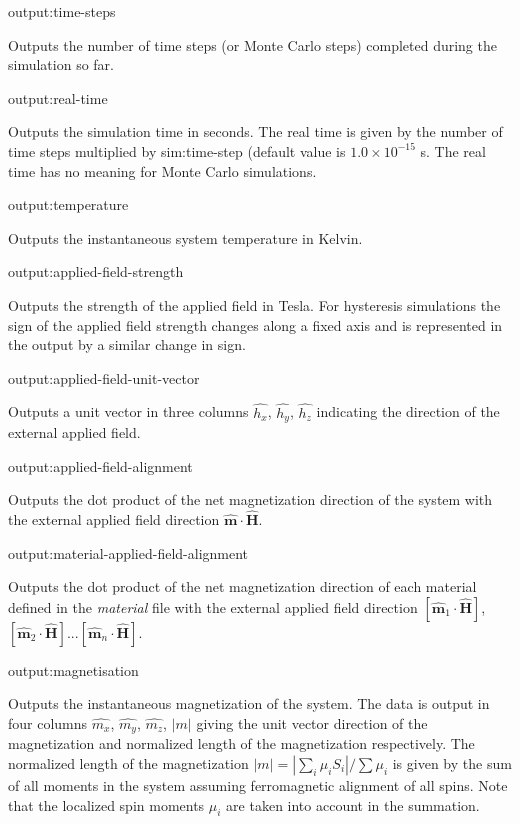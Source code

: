 {\zicf output:time-steps} Outputs the number of time steps (or Monte Carlo steps) completed during the simulation so far.

{\zicf output:real-time} Outputs the simulation time in seconds. The real time is given by the number of time steps multiplied by sim:time-step (default value is $1.0 \times 10^{-15}$ s. The real time has no meaning for Monte Carlo simulations.

{\zicf output:temperature} Outputs the instantaneous system temperature in Kelvin.

{\zicf output:applied-field-strength} Outputs the strength of the applied field in Tesla. For hysteresis simulations the sign of the applied field strength changes along a fixed axis and is represented in the output by a similar change in sign.

{\zicf output:applied-field-unit-vector} Outputs a unit vector in three columns $\hat{h_x}$, $\hat{h_y}$, $\hat{h_z}$ indicating the direction of the external applied field.

{\zicf output:applied-field-alignment} Outputs the dot product of the net magnetization direction of the system with the external applied field direction $\hat{\mathbf{m}} \cdot \hat{\mathbf{H}}$.

{\zicf output:material-applied-field-alignment} Outputs the dot product of the net magnetization direction of each material defined in the \textit{material} file with the external applied field direction $\left[\hat{\mathbf{m}}_1 \cdot \hat{\mathbf{H}}\right]$, $\left[\hat{\mathbf{m}}_2 \cdot \hat{\mathbf{H}}\right]$...$\left[\hat{\mathbf{m}}_n \cdot \hat{\mathbf{H}}\right]$.

{\zicf output:magnetisation} Outputs the instantaneous magnetization of the system. The data is output in four columns $\hat{m_x}$, $\hat{m_y}$, $\hat{m_z}$, $|m|$ giving the unit vector direction of the magnetization and
normalized length of the magnetization respectively. The normalized length of the magnetization $|m| = |\sum_i \mu_i S_i| / \sum \mu_i$ is given by the sum of all moments in the system assuming ferromagnetic alignment of all spins. Note that the localized spin moments $\mu_i$ are taken into account in the summation.

